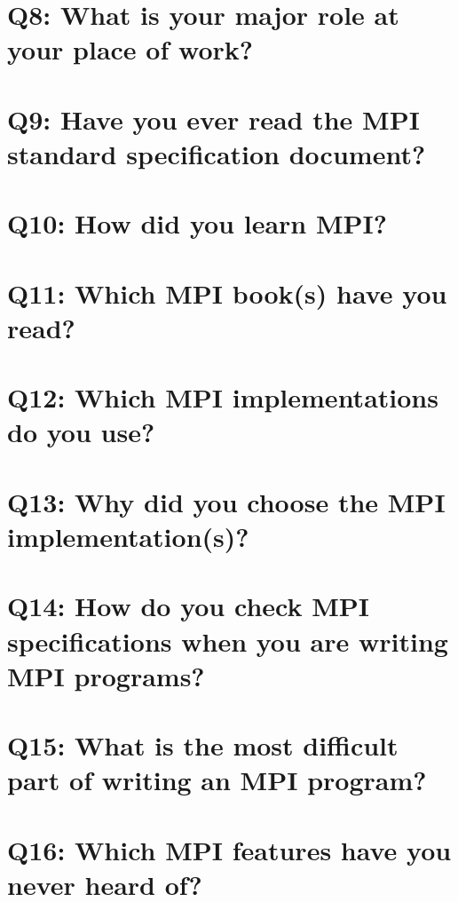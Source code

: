\documentclass{report}
\begin{document}
\clearpage
\section{Q8: What is your major role at your place of work?}


\clearpage
\section{Q9: Have you ever read the MPI standard specification document?}


\clearpage
\section{Q10: How did you learn MPI?}


\clearpage
\section{Q11: Which MPI book(s) have you read?}


\clearpage
\section{Q12: Which MPI implementations do you use?}


\clearpage
\section{Q13: Why did you choose the MPI implementation(s)?}


\clearpage
\section{Q14: How do you check MPI specifications when you are writing MPI programs?}


\clearpage
\section{Q15: What is the most difficult part of writing an MPI program?}


\clearpage
\section{Q16: Which MPI features have you never heard of?}

\end{document}
